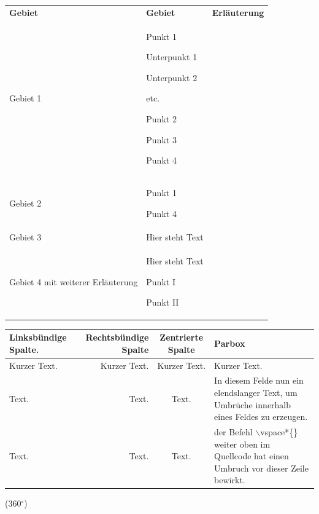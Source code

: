 \begin{longtable}{P{3cm}P{3cm}P{6cm}@{}}
\textbf{Gebiet}&  \textbf{Gebiet} & \textbf{Erläuterung} \\
  Gebiet 1 &
    \begin{mycompactitem}
      \item Punkt 1 
        \begin{compactitem}
          \item Unterpunkt 1
          \item Unterpunkt 2
          \item etc.
        \end{compactitem}
      \item Punkt 2
      \item Punkt 3
      \item Punkt 4
    \end{mycompactitem} \\
  Gebiet 2 & 
    \begin{mycompactitem}
      \item Punkt 1 
      \item Punkt 4
    \end{mycompactitem} \\
  Gebiet 3 & 
    Hier steht Text\\
  Gebiet 4 mit weiterer Erläuterung & 
    Hier steht Text 
      \begin{mycompactitem}
        \item Punkt I
        \item Punkt II
      \end{mycompactitem} 
\end{longtable}


 \begin{longtable}{|l|r|c|p{2cm}|}
 \hline
 Linksbündige Spalte.&Rechtsbündige Spalte&Zentrierte Spalte&Parbox\\
 \hline
 Kurzer Text.&Kurzer Text.&Kurzer Text.&Kurzer Text.\\
 \hline
 Text.&Text.&Text.&In diesem Felde nun ein elendslanger Text, um Umbrüche innerhalb eines Feldes zu erzeugen.\\
 \hline
 Text.&Text.&Text.&der Befehl $\backslash$vspace*\{\} weiter oben im Quellcode hat einen Umbruch vor dieser Zeile bewirkt.\\
 \hline
 \end{longtable}
 
 (360$^\circ$)